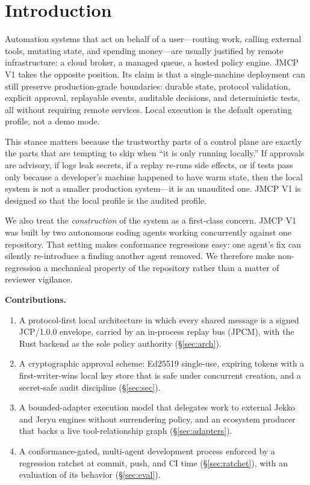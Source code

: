 \documentclass[conference]{IEEEtran}
\begin{document}
\section{Introduction}

Automation systems that act on behalf of a user---routing work, calling
external tools, mutating state, and spending money---are usually justified by
remote infrastructure: a cloud broker, a managed queue, a hosted policy engine.
JMCP V1 takes the opposite position. Its claim is that a single-machine
deployment can still preserve production-grade boundaries: durable state,
protocol validation, explicit approval, replayable events, auditable decisions,
and deterministic tests, all without requiring remote services. Local execution
is the default operating profile, not a demo mode.

This stance matters because the trustworthy parts of a control plane are
exactly the parts that are tempting to skip when ``it is only running
locally.'' If approvals are advisory, if logs leak secrets, if a replay re-runs
side effects, or if tests pass only because a developer's machine happened to
have warm state, then the local system is not a smaller production system---it
is an unaudited one. JMCP V1 is designed so that the local profile is the
audited profile.

We also treat the \emph{construction} of the system as a first-class concern.
JMCP V1 was built by two autonomous coding agents working concurrently against
one repository. That setting makes conformance regressions easy: one agent's
fix can silently re-introduce a finding another agent removed. We therefore
make non-regression a mechanical property of the repository rather than a
matter of reviewer vigilance.

\noindent\textbf{Contributions.}
\begin{enumerate}
\item A protocol-first local architecture in which every shared message is a
signed JCP/1.0.0 envelope, carried by an in-process replay bus (JPCM), with the
Rust backend as the sole policy authority (\S\ref{sec:arch}).
\item A cryptographic approval scheme: Ed25519 single-use, expiring tokens with
a first-writer-wins local key store that is safe under concurrent creation, and
a secret-safe audit discipline (\S\ref{sec:sec}).
\item A bounded-adapter execution model that delegates work to external Jekko
and Jeryu engines without surrendering policy, and an ecosystem producer that
backs a live tool-relationship graph (\S\ref{sec:adapters}).
\item A conformance-gated, multi-agent development process enforced by a
regression ratchet at commit, push, and CI time (\S\ref{sec:ratchet}), with an
evaluation of its behavior (\S\ref{sec:eval}).
\end{enumerate}
\end{document}
